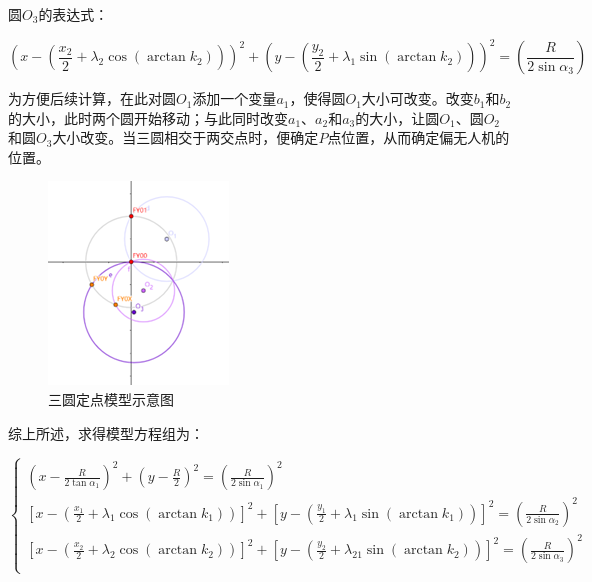 圆$O_3$的表达式：

\begin{equation}
    \left(
        x -
        \left(
            \frac{x_2}{2} + \lambda_2\cos(\arctan k_2)
        \right)
    \right)^2
    +
    \left(
        y -
        \left(
            \frac{y_2}{2} + \lambda_1\sin(\arctan k_2)
        \right)
    \right)^2
    =
    \left(
        \frac{R}{2\sin\alpha_3}
    \right)
\end{equation}

为方便后续计算，在此对圆$O_1$添加一个变量$a_1$，使得圆$O_1$大小可改变。改变$b_1$和$b_2$的大小，此时两个圆开始移动；与此同时改变$a_1$、$a_2$和$a_3$的大小，让圆$O_1$、圆$O_2$和圆$O_3$大小改变。当三圆相交于两交点时，便确定$P$点位置，从而确定偏无人机的位置。

\begin{figure}
    \centering
    \includegraphics{res/figure111138.png}
    \caption{三圆定点模型示意图}
\end{figure}

综上所述，求得模型方程组为：

\begin{equation}
    \begin{cases}
        \left(x - \frac{R}{2\tan\alpha_1}\right)^2 +
        \left(y - \frac{R}{2}\right)^2 =
        \left(\frac{R}{2\sin\alpha_1}\right)^2    \\

        \left[x - (\frac{x_1}{2} + \lambda_1\cos(\arctan k_1))\right]^2 +
        \left[y - (\frac{y_1}{2} + \lambda_1\sin(\arctan k_1))\right]^2 =
        \left(\frac{R}{2\sin\alpha_2}\right)^2    \\

        \left[x - (\frac{x_2}{2} + \lambda_2\cos(\arctan k_2))\right]^2 +
        \left[y - (\frac{y_2}{2} + \lambda_21\sin(\arctan k_2))\right]^2 =
        \left(\frac{R}{2\sin\alpha_3}\right)^2    \\
    \end{cases}
\end{equation}

